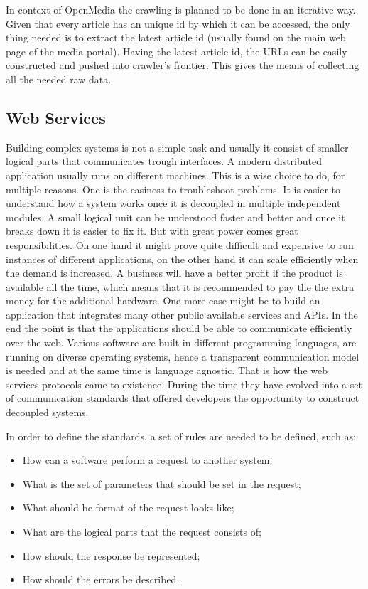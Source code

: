 In context of OpenMedia the crawling is planned to be done in an iterative way. Given that every article has an unique id by which it can be accessed, the only thing needed is to extract the latest article id (usually found on the main web page of the media portal). Having the latest article id, the URLs can be easily constructed and pushed into crawler's frontier. This gives the means of collecting all the needed raw data.

\subsection{Web Services}
Building complex systems is not a simple task and usually it consist of smaller logical parts that communicates trough interfaces. A modern distributed application usually runs on different machines. This is a wise choice to do, for multiple reasons. One is the easiness to troubleshoot problems. It is easier to understand how a system works once it is decoupled in multiple independent modules. A small logical unit can be understood faster and better and once it breaks down it is easier to fix it. But with great power comes great responsibilities. On one hand it might prove quite difficult and expensive to run instances of different applications, on the other hand it can scale efficiently when the demand is increased. A business will have a better profit if the product is available all the time, which means that it is recommended to pay the the extra money for the additional hardware. One more case might be to build an application that integrates many other public available services and APIs. In the end the point is that the applications should be able to communicate efficiently over the web. Various software are built in different programming languages, are running on diverse operating systems, hence a transparent communication model is needed and at the same time is language agnostic. That is how the web services protocols came to existence. During the time they have evolved into a set of communication standards that offered developers the opportunity to construct decoupled systems.

In order to define the standards, a set of rules are needed to be defined, such as:
\begin{itemize}
    \item How can a software perform a request to another system;
    \item What is the set of parameters that should be set in the request;
    \item What should be format of the request looks like;
    \item What are the logical parts that the request consists of;
    \item How should the response be represented;
    \item How should the errors be described.
\end{itemize}

